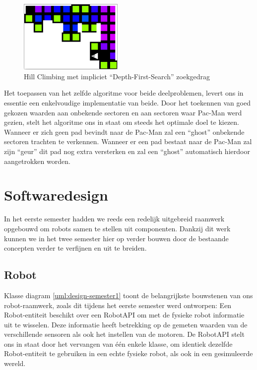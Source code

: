 \documentclass[12pt,a4paper]{report}
\begin{document}
\begin{figure}[htbp]
  \centering
  \includegraphics[width=50mm]{resources/dfs.png}
  \caption{Hill Climbing met impliciet ``Depth-First-Search'' zoekgedrag}
  \label{fig:dfs}
\end{figure}

Het toepassen van het zelfde algoritme voor beide deelproblemen, levert ons in essentie een enkelvoudige implementatie van beide. Door het toekennen van goed gekozen waarden aan onbekende sectoren en aan sectoren waar Pac-Man werd gezien, stelt het algoritme ons in staat om steeds het optimale doel te kiezen. Wanneer er zich geen pad bevindt naar de Pac-Man zal een ``ghost'' onbekende sectoren trachten te verkennen. Wanneer er een pad bestaat naar de Pac-Man zal zijn ``geur'' dit pad nog extra versterken en zal een ``ghost'' automatisch hierdoor aangetrokken worden.

\chapter{Softwaredesign}

In het eerste semester hadden we reeds een redelijk uitgebreid raamwerk opgebouwd om robots samen te stellen uit componenten. Dankzij dit werk kunnen we in het twee semester hier op verder bouwen door de bestaande concepten verder te verfijnen en uit te breiden.

\section{Robot}

Klasse diagram \ref{uml:design-semester1} toont de belangrijkste bouwstenen van ons robot-raamwerk, zoals dit tijdens het eerste semester werd ontworpen: Een Robot-entiteit beschikt over een RobotAPI om met de fysieke robot informatie uit te wisselen. Deze informatie heeft betrekking op de gemeten waarden van de verschillende sensoren als ook het instellen van de motoren. De RobotAPI stelt ons in staat door het vervangen van \'e\'en enkele klasse, om identiek dezelfde Robot-entiteit te gebruiken in een echte fysieke robot, als ook in een gesimuleerde wereld.
\end{document}
